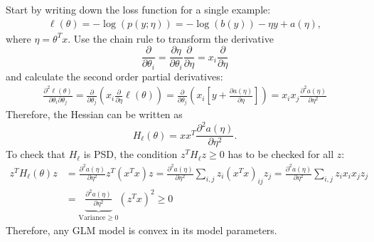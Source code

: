 \begin{answer}
Start by writing down the loss function for a single example:
\begin{align*}
    \ell(\theta) = - \log(p(y;\eta)) = - \log(b(y)) - \eta y + a(\eta),
\end{align*}
where $\eta=\theta^T x$.
Use the chain rule to transform the derivative
\begin{equation*}
    \frac{\partial}{\partial\theta_i} = \frac{\partial\eta}{\partial\theta_i} \frac{\partial}{\partial\eta} = x_i \frac{\partial}{\partial\eta}
\end{equation*}
and calculate the second order partial derivatives:
\begin{align*}
    \frac{\partial^2 \ell(\theta)}{\partial\theta_i\partial\theta_j} =  \frac{\partial}{\partial\theta_j} \left(x_i \frac{\partial}{\partial\eta} \ell(\theta) \right)  =
    \frac{\partial}{\partial\theta_j} \left(x_i \left[y + \frac{\partial a(\eta)}{\partial\eta}\right] \right)  = x_i x_j \frac{\partial^2 a(\eta)}{\partial\eta^2}
\end{align*}
Therefore, the Hessian can be written as 
\begin{equation*}
    H_\ell(\theta) = xx^T\frac{\partial^2 a(\eta)}{\partial\eta^2}.
\end{equation*}
To check that $H_\ell$ is PSD, the condition $z^T H_\ell z \geq 0$ has to be checked for all $z$:
\begin{align*}
z^T H_\ell(\theta) z &= \frac{\partial^2 a(\eta)}{\partial\eta^2} z^T (x^T x) z = \frac{\partial^2 a(\eta)}{\partial\eta^2} \sum_{i,j} z_i (x^T x)_{ij} z_j
 = \frac{\partial^2 a(\eta)}{\partial\eta^2} \sum_{i,j} z_i x_i x_j z_j \\
 &= \underbrace{\frac{\partial^2 a(\eta)}{\partial\eta^2}}_{\text{Variance} \geq 0} (z^T x)^2 \geq 0
\end{align*}
Therefore, any GLM model is convex in its model parameters.
\end{answer}

